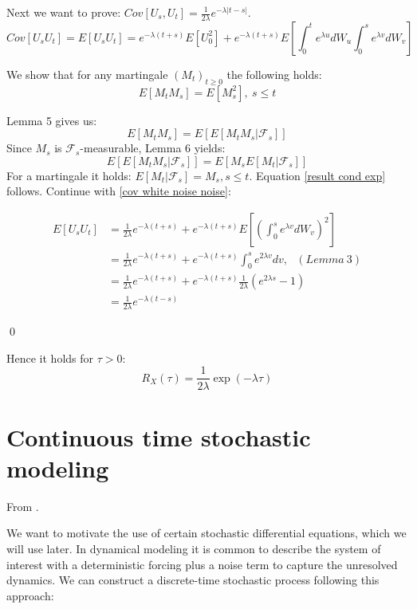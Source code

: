 \documentclass[%
thesis=student,%
coverpage=false,%
titlepage=false,%
headmarks=true, %
english,%
font=libertine, %
math=newpxtx, %
BCOR=5mm,%
coverBCOR=11mm%
]{tumbook}
\begin{document}
Next we want to prove: $Cov[U_{s},U_{t}] = \frac{1}{2\lambda}e^{-\lambda \lvert t-s \rvert}$. 
\begin{equation}
    Cov[U_{s}U_{t}]=E[U_{s}U_{t}] = e^{-\lambda(t+s)}E[U_{0}^{2}] + e^{-\lambda(t+s)}E[\int_{0}^{t}e^{\lambda u}dW_{u}\int_{0}^{s}e^{\lambda v}dW_{v}]
    \label{cov white noise noise}
\end{equation}

We show that for any martingale $(M_{t})_{t \geq 0}$ the following holds: 
\begin{equation}
    E[M_{t}M_{s}] = E[M_{s}^{2}], \ s \leq t
    \label{result cond exp}
\end{equation}

Lemma 5 gives us:
\[
E[M_{t}M_{s}] = E[E[M_{t}M_{s}|\mathcal{F}_{s}]]
\]
Since $M_{s}$ is $\mathcal{F}_{s}$-measurable, Lemma 6 yields:
\[
E[E[M_{t}M_{s}|\mathcal{F}_{s}]] = E[M_{s}E[M_{t}|\mathcal{F}_{s}]]
\]
For a martingale it holds: $E[M_{t}|\mathcal{F}_{s}] = M_{s}, s \leq t$. Equation \ref{result cond exp} follows. Continue with \ref{cov white noise noise}:


\begin{subequations}
    \begin{align*}
        E[U_{s}U_{t}] &= \frac{1}{2\lambda}e^{-\lambda(t+s)} + e^{-\lambda(t+s)}E[(\int_{0}^{s}e^{\lambda v}dW_{v})^{2}]   \\
         &= \frac{1}{2\lambda}e^{-\lambda(t+s)} + e^{-\lambda(t+s)}\int_{0}^{s}e^{2\lambda v}dv, \ \ \ (Lemma \ 3) \\
         &= \frac{1}{2\lambda}e^{-\lambda(t+s)} + e^{-\lambda(t+s)}\frac{1}{2\lambda}(e^{2\lambda s} - 1) \\
         &= \frac{1}{2\lambda}e^{-\lambda(t-s)} 
    \end{align*}
\end{subequations}   

\qed

Hence it holds for $\tau > 0$:
\[
R_{X}(\tau) =  \frac{1}{2\lambda}\exp(-\lambda\tau)
\]


\section{Continuous time stochastic modeling}
From \cite{Morr:2022}.

We want to motivate the use of certain stochastic differential equations, which we will use later. 
In dynamical modeling it is common to describe the system of interest with a deterministic forcing plus a noise term to capture the unresolved dynamics. We can construct a discrete-time stochastic process following this approach:
\end{document}
